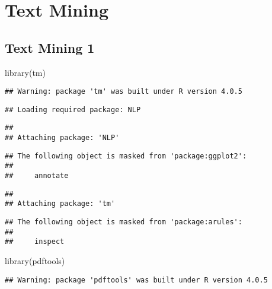 \documentclass[
]{book}
\newenvironment{Shaded}{\begin{snugshade}}{\end{snugshade}}
\newcommand{\FunctionTok}[1]{\textcolor[rgb]{0.00,0.00,0.00}{#1}}
\newcommand{\NormalTok}[1]{#1}
\begin{document}
\hypertarget{text-mining}{%
\chapter{Text Mining}\label{text-mining}}

\hypertarget{text-mining-1}{%
\section{Text Mining 1}\label{text-mining-1}}

\begin{Shaded}
\begin{Highlighting}[]
\FunctionTok{library}\NormalTok{(tm)}
\end{Highlighting}
\end{Shaded}

\begin{verbatim}
## Warning: package 'tm' was built under R version 4.0.5
\end{verbatim}

\begin{verbatim}
## Loading required package: NLP
\end{verbatim}

\begin{verbatim}
## 
## Attaching package: 'NLP'
\end{verbatim}

\begin{verbatim}
## The following object is masked from 'package:ggplot2':
## 
##     annotate
\end{verbatim}

\begin{verbatim}
## 
## Attaching package: 'tm'
\end{verbatim}

\begin{verbatim}
## The following object is masked from 'package:arules':
## 
##     inspect
\end{verbatim}

\begin{Shaded}
\begin{Highlighting}[]
\FunctionTok{library}\NormalTok{(pdftools)}
\end{Highlighting}
\end{Shaded}

\begin{verbatim}
## Warning: package 'pdftools' was built under R version 4.0.5
\end{verbatim}
\end{document}
